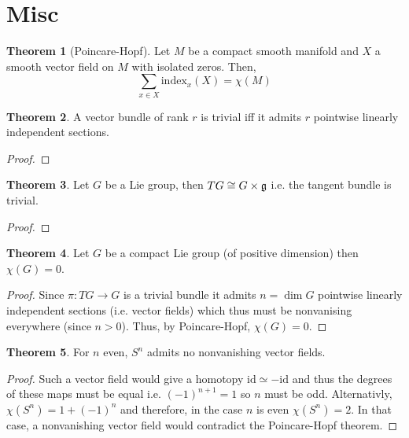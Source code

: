 \documentclass[12pt]{extarticle}
\newcommand{\id}{\mathrm{id}}
\theoremstyle{definition}
\newtheorem{theorem}{Theorem}[section]
\begin{document}
\section{Misc}

\begin{theorem}[Poincare-Hopf]
Let $M$ be a compact smooth manifold and $X$ a smooth vector field on $M$ with isolated zeros. Then,
\[ \sum_{x \in X} \mathrm{index}_x(X) = \chi(M) \]
\end{theorem}

\begin{theorem}
A vector bundle of rank $r$ is trivial iff it admits $r$ pointwise linearly independent sections.
\end{theorem}

\begin{proof}

\end{proof}

\begin{theorem}
Let $G$ be a Lie group, then $TG \cong G \times \mathfrak{g}$ i.e. the tangent bundle is trivial.
\end{theorem}

\begin{proof}

\end{proof}

\begin{theorem}
Let $G$ be a compact Lie group (of positive dimension) then $\chi(G) = 0$.
\end{theorem}

\begin{proof}
Since $\pi : T G \to G$ is a trivial bundle it admits $n = \dim{G}$ pointwise linearly independent sections (i.e. vector fields) which thus must be nonvanising everywhere (since $n > 0$). Thus, by Poincare-Hopf, $\chi(G) = 0$.
\end{proof}

\begin{theorem}
For $n$ even, $S^n$ admits no nonvanishing vector fields.
\end{theorem}

\begin{proof}
Such a vector field would give a homotopy $\id \simeq - \id$ and thus the degrees of these maps must be equal i.e. $(-1)^{n+1} = 1$ so $n$ must be odd. Alternativly, $\chi(S^n) = 1 + (-1)^n$ and therefore, in the case $n$ is even $\chi(S^n) = 2$. In that case, a nonvanishing vector field would contradict the Poincare-Hopf theorem.
\end{proof}
\end{document}
